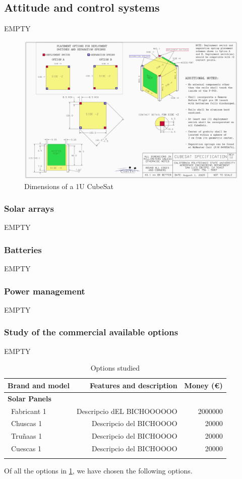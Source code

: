 \subsection{Attitude and control systems}

EMPTY

\begin{figure}[h]
\includegraphics[scale=0.6]{./sections/SatelliteDesign/images/CubeSatDesign}
\centering
\caption{Dimensions of a 1U CubeSat \cite{cubesatdimensions}}
\end{figure}

\subsubsection{Solar arrays}
EMPTY
\subsubsection{Batteries}
EMPTY
\subsubsection{Power management}
EMPTY
\subsubsection{Study of the commercial available options}
EMPTY

\begin{longtable}{| l | r | r | }
\hline
\rowcolor[gray]{0.80}	\textbf{Brand and model} &  \textbf{Features and description}     & \textbf{Money (\euro)}   \\
\hline
\endfirsthead

\rowcolor[gray]{0.85} \textbf{Solar Panels} &  &  \\
	   ~Fabricant 1 & Descripcio dEL BICHOOOOOO & 2000000 \\
	   ~Chuscas 1 & Descripcio del BICHOOOO & 20000 \\
	   ~Truñaas 1 & Descripcio del BICHOOOO & 20000 \\
	   ~Cuescas 1 & Descripcio del BICHOOOO & 20000 \\
	\hline

\caption{Options studied}
\label{epsoptionstable}
\end{longtable}

Of all the options in \ref{epsoptionstable}, we have chosen the following options.

